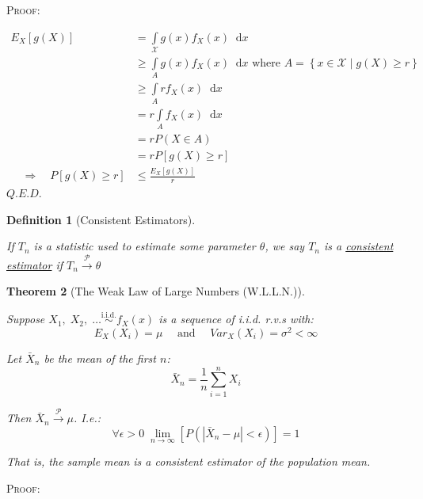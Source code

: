\documentclass[12pt,a4paper]{article}
\newcommand{\imply}{\quad\Rightarrow\quad}
\newtheorem{thm}{Theorem}[subsection]
\newtheorem{defn}[thm]{Definition}
\newcommand{\diff}{\;\mathrm{d}}
\renewcommand{\imply}{\quad\Rightarrow\quad}
\begin{document}
\noindent\textsc{Proof:}\par\vspace{1cm}

\begin{align*}
E_X\left[g(X)\right] &= \int\limits_{\mathcal{X}}\!\! g(x)f_X(x)\;\diff x\\
&\geq \int\limits_{A}\!\! g(x)f_X(x)\;\diff x \mbox{ where $A = \left\{x\in\mathcal{X}\mid g(X) \geq r\right\}$}\\
&\geq \int\limits_{A}\!\! rf_X(x)\;\diff x\\
&= r \int\limits_{A}\!\! f_X(x)\;\diff x\\
&= r P\left(X\in A\right)\\
&= r P\left[g(X)\geq r\right]\\
\imply P\left[g(X)\geq r\right] &\leq \frac{E_X\left[g(X)\right]}{r}
\end{align*}\hfill$Q.E.D.$\par\vspace{1cm}


\begin{defn}[Consistent Estimators]$\;$\par\vspace{1cm}

If $T_n$ is a statistic used to estimate some parameter $\theta$, we say $T_n$ is a \underline{consistent estimator} if $T_n\xrightarrow{\mathscr{P}}\theta$

\end{defn}

\begin{thm}[The Weak Law of Large Numbers (W.L.L.N.)]$\;$\par\vspace{1cm}

Suppose $X_1,\;X_2,\;\hdots \overset{\text{i.i.d.}}{\sim} f_X(x)$ is a sequence of i.i.d. r.v.s with:
$$E_X(X_i) = \mu\quad \text{ and }\quad Var_X(X_i) = \sigma^2 < \infty$$

Let $\bar{X}_n$ be the mean of the first $n$:
$$\bar{X}_n = \frac{1}{n} \sum_{i=1}^n X_i$$

Then $\bar{X}_n\xrightarrow{\mathscr{P}}\mu$. I.e.:
$$\forall \epsilon > 0 \;\lim_{n\to\infty}\left[P\left(\left|\bar{X}_n-\mu\right|<\epsilon\right)\right] = 1$$

That is, the sample mean is a consistent estimator of the population mean.

\end{thm}

\noindent\textsc{Proof:}\par\vspace{1cm}
\end{document}
